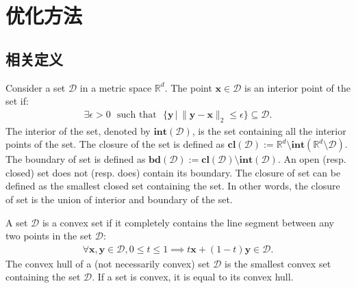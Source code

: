 \documentclass[lang=cn,10pt]{gorgeousnbook}
\numberwithin{equation}{section}%
\numberwithin{figure}{section}%
\begin{document}

\chapter{优化方法}
\section{相关定义}
\begin{definition}[内点与边界点]
  Consider a set $\mathcal{D}$ in a metric space $\mathbb{R}^d$. The point $\boldsymbol{x} \in \mathcal{D}$ is an interior point of the set if:
  \begin{align*}
  \exists \epsilon > 0\,\,\,\, \text{such that}\,\,\,\, \{\boldsymbol{y}\, |\, \|\boldsymbol{y} - \boldsymbol{x}\|_2 \leq \epsilon\} \subseteq \mathcal{D}.
  \end{align*}
  The interior of the set, denoted by $\textbf{int}(\mathcal{D})$, is the set containing all the interior points of the set. 
  The closure of the set is defined as $\textbf{cl}(\mathcal{D}) := \mathbb{R}^d \setminus \textbf{int}(\mathbb{R}^d \setminus \mathcal{D})$.
  The boundary of set is defined as $\textbf{bd}(\mathcal{D}) := \textbf{cl}(\mathcal{D}) \setminus \textbf{int}(\mathcal{D})$.
  An open (resp. closed) set does not (resp. does) contain its boundary. 
  The closure of set can be defined as the smallest closed set containing the set. In other words, the closure of set is the union of interior and boundary of the set. 
\end{definition}
\begin{definition}[凸集和凸面体]
  A set $\mathcal{D}$ is a convex set if it completely contains the line segment between any two points in the set $\mathcal{D}$:
  \begin{align*}
  \forall \boldsymbol{x}, \boldsymbol{y} \in \mathcal{D}, 0 \leq t \leq 1 \implies t \boldsymbol{x} + (1 - t) \boldsymbol{y} \in \mathcal{D}.
  \end{align*}
  The convex hull of a (not necessarily convex) set $\mathcal{D}$ is the smallest convex set containing the set $\mathcal{D}$. If a set is convex, it is equal to its convex hull. 
\end{definition}
  
\end{document}
